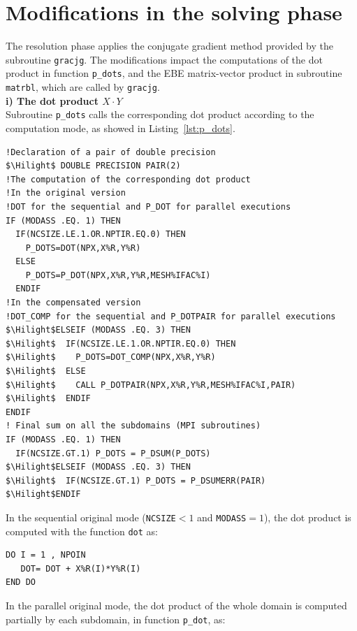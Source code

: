 \section{Modifications in the solving phase}
\label{sec:imple_solve}
%
The resolution phase applies the conjugate gradient method
provided by the subroutine \texttt{gracjg}.
The modifications impact the computations of the dot product
in function \texttt{p\_dots}, and the EBE
matrix-vector product in subroutine \texttt{matrbl},
which are called by \texttt{gracjg}.\\
%
\textbf{i) The dot product $X \cdot Y$}\\
Subroutine \texttt{p\_dots} calls the corresponding dot product according to the computation mode,
as showed in Listing~\ref{lst:p_dots}.
%
\begin{lstlisting}[language=TelFortran, caption={The calls of the corresponding dot product in \texttt{p\_dots}},label={lst:p_dots},escapechar=\$]
!Declaration of a pair of double precision
$\Hilight$ DOUBLE PRECISION PAIR(2)
!The computation of the corresponding dot product
!In the original version
!DOT for the sequential and P_DOT for parallel executions
IF (MODASS .EQ. 1) THEN
  IF(NCSIZE.LE.1.OR.NPTIR.EQ.0) THEN
    P_DOTS=DOT(NPX,X%R,Y%R)
  ELSE
    P_DOTS=P_DOT(NPX,X%R,Y%R,MESH%IFAC%I)
  ENDIF
!In the compensated version
!DOT_COMP for the sequential and P_DOTPAIR for parallel executions
$\Hilight$ELSEIF (MODASS .EQ. 3) THEN
$\Hilight$  IF(NCSIZE.LE.1.OR.NPTIR.EQ.0) THEN
$\Hilight$    P_DOTS=DOT_COMP(NPX,X%R,Y%R)
$\Hilight$  ELSE
$\Hilight$    CALL P_DOTPAIR(NPX,X%R,Y%R,MESH%IFAC%I,PAIR)
$\Hilight$  ENDIF
ENDIF
! Final sum on all the subdomains (MPI subroutines)
IF (MODASS .EQ. 1) THEN
  IF(NCSIZE.GT.1) P_DOTS = P_DSUM(P_DOTS)
$\Hilight$ELSEIF (MODASS .EQ. 3) THEN
$\Hilight$  IF(NCSIZE.GT.1) P_DOTS = P_DSUMERR(PAIR)
$\Hilight$ENDIF
\end{lstlisting}
%
In the sequential original mode (\texttt{NCSIZE}$<1$ and \texttt{MODASS}$=1$),
the dot product is computed with the function \texttt{dot} as:
\begin{lstlisting}[language=TelFortran,numbers=none,frame=none,escapechar=\$]
DO I = 1 , NPOIN
   DOT= DOT + X%R(I)*Y%R(I)
END DO
\end{lstlisting}
%
In the parallel original mode, the dot product of the whole domain
is computed partially by each subdomain, in function \texttt{p\_dot}, as:

